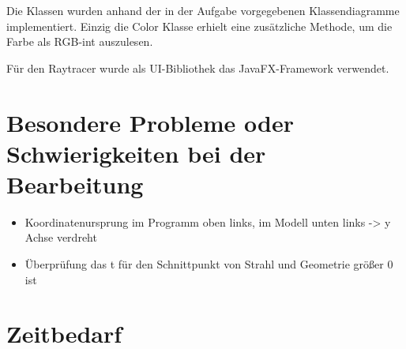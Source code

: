 \documentclass[a4paper,parskip=half,11pt]{scrartcl}
\begin{document}
Die Klassen wurden anhand der in der Aufgabe vorgegebenen Klassendiagramme implementiert.
Einzig die Color Klasse erhielt eine zusätzliche Methode, um die Farbe als RGB-int auszulesen.

Für den Raytracer wurde als UI-Bibliothek das JavaFX-Framework verwendet.


\section*{Besondere Probleme oder Schwierigkeiten bei der Bearbeitung}

\begin{itemize}
\item Koordinatenursprung im Programm oben links, im Modell unten links -> y Achse verdreht
\item Überprüfung das t für den Schnittpunkt von Strahl und Geometrie größer 0 ist
\end{itemize}


\section*{Zeitbedarf}
\end{document}
